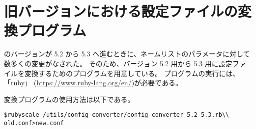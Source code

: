 \section{旧バージョンにおける設定ファイルの変換プログラム}

\scalelib のバージョンが 5.2 から 5.3 へ進むときに、ネームリストのパラメータに対して数多くの変更がなされた。
そのため、バージョン 5.2 用から 5.3 用に設定ファイルを変換するためのプログラムを用意している。
プログラムの実行には、「ruby」 (\url{https://www.ruby-lang.org/en/})が必要である。

変換プログラムの使用方法は以下である。\\
\begin{alltt}
 \$ ruby scale-{\version}/utils/config-converter/config-converter_5.2-5.3.rb \verb|\\|
        old.conf > new.conf
\end{alltt}
